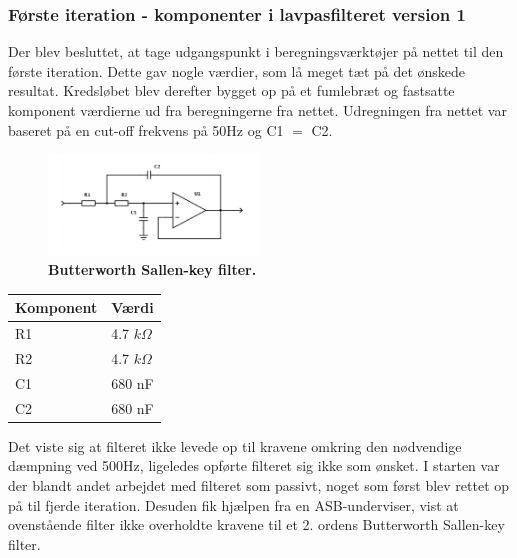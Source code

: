 \subsubsection{Første iteration - komponenter i lavpasfilteret version 1}
Der blev besluttet, at tage udgangspunkt i beregningsværktøjer på nettet \cite{filter}  til den første iteration. Dette gav nogle værdier, som lå meget tæt på det ønskede resultat. Kredsløbet blev derefter bygget op på et fumlebræt og fastsatte komponent værdierne ud fra beregningerne fra nettet. Udregningen fra nettet var baseret på en cut-off frekvens på 50Hz og C1 $=$ C2.
\begin{figure}[H]
\includegraphics[width =0.5\textwidth , center]{billeder/butterworth}
\caption{\textbf{Butterworth Sallen-key filter.}}
\end{figure}
\begin{table}[H]
\begin{tabular}{| l | l |}
   \hline
   Komponent & Værdi\\ \hline
   R1 & 4.7 $k\Omega$ \\ \hline
   R2 & 4.7 $k\Omega$ \\ \hline
   C1 & 680 nF\\\hline
   C2 & 680 nF\\\hline
\end{tabular}
\end{table}
Det viste sig at filteret ikke levede op til kravene omkring den nødvendige dæmpning ved 500Hz, ligeledes opførte filteret sig ikke som ønsket. I starten var der blandt andet arbejdet med filteret som passivt, noget som først blev rettet op på til fjerde iteration. Desuden fik hjælpen fra en ASB-underviser, vist at ovenstående filter ikke overholdte kravene til et 2. ordens Butterworth Sallen-key filter. 
